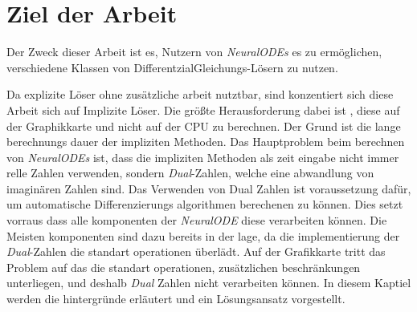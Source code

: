 
\section{Ziel der Arbeit}

Der Zweck dieser Arbeit ist es, Nutzern von \textit{NeuralODEs} es zu ermöglichen, 
verschiedene Klassen von DifferentzialGleichungs-Lösern zu nutzen.


Da explizite Löser ohne zusätzliche arbeit nutztbar, 
sind konzentiert sich diese Arbeit sich auf Implizite Löser. 
Die größte Herausforderung dabei ist , 
diese auf der Graphikkarte und nicht auf der CPU zu berechnen.
Der Grund ist die lange berechnungs dauer der impliziten Methoden.
Das Hauptproblem beim berechnen von \textit{NeuralODEs} ist, 
dass die impliziten Methoden als zeit eingabe nicht immer relle Zahlen verwenden,
sondern \textit{Dual}-Zahlen, welche eine abwandlung von imaginären Zahlen sind.
Das Verwenden von Dual Zahlen ist voraussetzung dafür, 
um automatische Differenzierungs algorithmen berechenen zu können.
Dies setzt vorraus dass alle komponenten der \textit{NeuralODE} diese verarbeiten können.
Die Meisten komponenten sind dazu bereits in der lage, 
da die implementierung der \textit{Dual}-Zahlen
die standart operationen überlädt.
Auf der Grafikkarte tritt das Problem auf das die standart operationen, 
zusätzlichen beschränkungen unterliegen, 
und deshalb \textit{Dual} Zahlen nicht verarbeiten können.
In diesem Kaptiel werden die hintergründe erläutert und ein Lösungsansatz vorgestellt.


